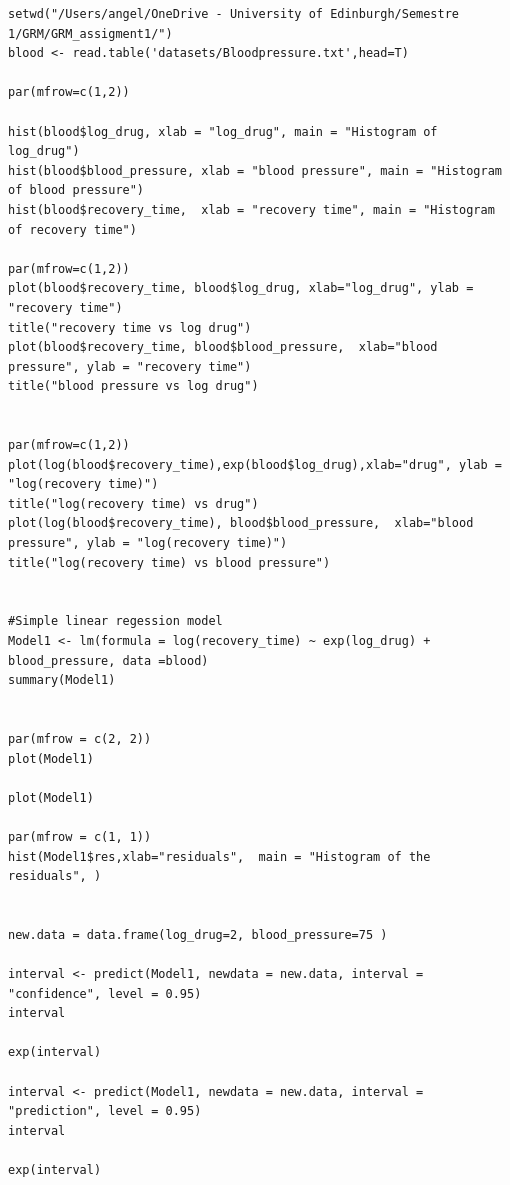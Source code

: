 \documentclass{article}
\begin{document}
\begin{verbatim}setwd("/Users/angel/OneDrive - University of Edinburgh/Semestre 1/GRM/GRM_assigment1/")
blood <- read.table('datasets/Bloodpressure.txt',head=T)

par(mfrow=c(1,2))

hist(blood$log_drug, xlab = "log_drug", main = "Histogram of log_drug")
hist(blood$blood_pressure, xlab = "blood pressure", main = "Histogram of blood pressure")
hist(blood$recovery_time,  xlab = "recovery time", main = "Histogram of recovery time")

par(mfrow=c(1,2))
plot(blood$recovery_time, blood$log_drug, xlab="log_drug", ylab = "recovery time")
title("recovery time vs log drug")
plot(blood$recovery_time, blood$blood_pressure,  xlab="blood pressure", ylab = "recovery time")
title("blood pressure vs log drug")


par(mfrow=c(1,2))
plot(log(blood$recovery_time),exp(blood$log_drug),xlab="drug", ylab = "log(recovery time)")
title("log(recovery time) vs drug")
plot(log(blood$recovery_time), blood$blood_pressure,  xlab="blood pressure", ylab = "log(recovery time)")
title("log(recovery time) vs blood pressure")


#Simple linear regession model 
Model1 <- lm(formula = log(recovery_time) ~ exp(log_drug) + blood_pressure, data =blood)
summary(Model1)


par(mfrow = c(2, 2))
plot(Model1)

plot(Model1)

par(mfrow = c(1, 1))
hist(Model1$res,xlab="residuals",  main = "Histogram of the residuals", )


new.data = data.frame(log_drug=2, blood_pressure=75 )

interval <- predict(Model1, newdata = new.data, interval = "confidence", level = 0.95)
interval

exp(interval)

interval <- predict(Model1, newdata = new.data, interval = "prediction", level = 0.95)
interval

exp(interval)



\end{verbatim}
\end{document}
